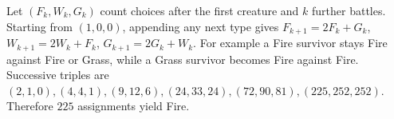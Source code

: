 Let $(F_k,W_k,G_k)$ count choices after the first creature and $k$ further battles. Starting from $(1,0,0)$, appending any next type gives $F_{k+1}=2F_k+G_k$, $W_{k+1}=2W_k+F_k$, $G_{k+1}=2G_k+W_k$. For example a Fire survivor stays Fire against Fire or Grass, while a Grass survivor becomes Fire against Fire. Successive triples are $(2,1,0),(4,4,1),(9,12,6),(24,33,24),(72,90,81),(225,252,252)$. Therefore $\boxed{225}$ assignments yield Fire.
